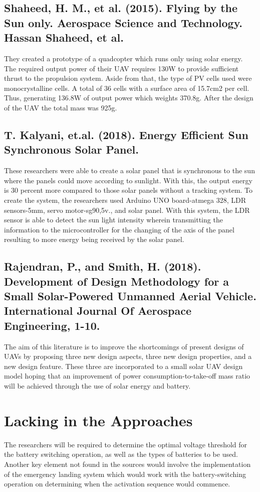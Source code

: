 \subsection{Shaheed, H. M., et al. (2015). Flying by the Sun only. Aerospace Science and Technology. Hassan Shaheed, et al.}
They created a prototype of a quadcopter which runs only using solar energy. The required output power of their UAV requires 130W to provide sufficient thrust to the propulsion system. Aside from that, the type of PV cells used were monocrystalline cells. A total of 36 cells with a surface area of 15.7cm2 per cell. Thus, generating 136.8W of output power which weights 370.8g. After the design of the UAV the total mass was 925g.

\subsection{T. Kalyani, et.al. (2018). Energy Efficient Sun Synchronous Solar Panel.}
These researchers were able to create a solar panel that is synchronous to the sun where the panels could move according to sunlight. With this, the output energy is 30 percent more compared to those solar panels without a tracking system. To create the system, the researchers used Arduino UNO board-atmega 328, LDR sensors-5mm, servo motor-sg90,5v., and solar panel. With this system, the LDR sensor is able to detect the sun light intensity wherein transmitting the information to the microcontroller for the changing of the axis of the panel resulting to more energy being received by the solar panel.

\subsection{Rajendran, P., and Smith, H. (2018). Development of Design Methodology for a Small Solar-Powered Unmanned Aerial Vehicle. International Journal Of Aerospace Engineering, 1-10.}
The aim of this literature is to improve the shortcomings of present designs of UAVs by proposing three new design aspects, three new design properties, and a new design feature. These three are incorporated to a small solar UAV design model hoping that an improvement of power consumption-to-take-off mass ratio will be achieved through the use of solar energy and battery.



\section{Lacking in the Approaches}
The researchers will be required to determine the optimal voltage threshold for the battery switching operation, as well as the types of batteries to be used. Another key element not found in the sources would involve the implementation of the emergency landing system which would work with the battery-switching operation on determining when the activation sequence would commence.








